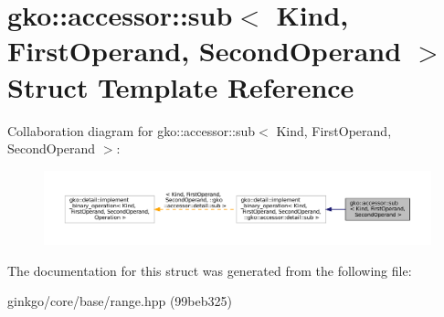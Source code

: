 \hypertarget{structgko_1_1accessor_1_1sub}{}\section{gko\+:\+:accessor\+:\+:sub$<$ Kind, First\+Operand, Second\+Operand $>$ Struct Template Reference}
\label{structgko_1_1accessor_1_1sub}


Collaboration diagram for gko\+:\+:accessor\+:\+:sub$<$ Kind, First\+Operand, Second\+Operand $>$\+:
\nopagebreak
\begin{figure}[H]
\begin{center}
\leavevmode
\includegraphics[width=350pt]{structgko_1_1accessor_1_1sub__coll__graph}
\end{center}
\end{figure}


The documentation for this struct was generated from the following file\+:\begin{DoxyCompactItemize}
\item 
ginkgo/core/base/range.\+hpp (99beb325)\end{DoxyCompactItemize}
